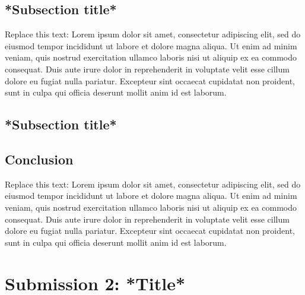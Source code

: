 \documentclass[a4paper, 11pt]{article}
\begin{document}
\subsection{*Subsection title*}

Replace this text: Lorem ipsum dolor sit amet, consectetur adipiscing elit, sed do eiusmod tempor incididunt ut labore et dolore magna aliqua. Ut enim ad minim veniam, quis nostrud exercitation ullamco laboris nisi ut aliquip ex ea commodo consequat. Duis aute irure dolor in reprehenderit in voluptate velit esse cillum dolore eu fugiat nulla pariatur. Excepteur sint occaecat cupidatat non proident, sunt in culpa qui officia deserunt mollit anim id est laborum.



\vspace{0.5cm}
\subsection{*Subsection title*}



\vspace{0.5cm}
\subsection{Conclusion}

Replace this text: Lorem ipsum dolor sit amet, consectetur adipiscing elit, sed do eiusmod tempor incididunt ut labore et dolore magna aliqua. Ut enim ad minim veniam, quis nostrud exercitation ullamco laboris nisi ut aliquip ex ea commodo consequat. Duis aute irure dolor in reprehenderit in voluptate velit esse cillum dolore eu fugiat nulla pariatur. Excepteur sint occaecat cupidatat non proident, sunt in culpa qui officia deserunt mollit anim id est laborum.






\newpage
\section{Submission 2: *Title*}
\end{document}
